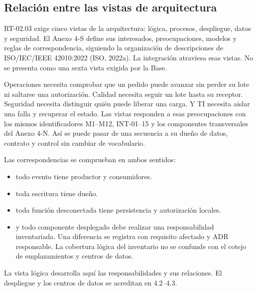 \subsection{Relación entre las vistas de arquitectura}
\label{sec:iso42010}

RT-02.03 exige cinco vistas de la arquitectura: lógica, procesos, despliegue, datos y seguridad. El Anexo 4-S define sus interesados, preocupaciones, modelos y reglas de correspondencia, siguiendo la organización de descripciones de ISO/IEC/IEEE 42010:2022 (ISO, 2022a). La integración atraviesa esas vistas. No se presenta como una sexta vista exigida por la Base.

Operaciones necesita comprobar que un pedido puede avanzar sin perder su lote ni saltarse una autorización. Calidad necesita seguir un lote hasta su receptor. Seguridad necesita distinguir quién puede liberar una carga. Y TI necesita aislar una falla y recuperar el estado. Las vistas responden a esas preocupaciones con los mismos identificadores M1--M12, INT-01--15 y los componentes transversales del Anexo 4-N. Así se puede pasar de una secuencia a su dueño de datos, contrato y control sin cambiar de vocabulario.

Las correspondencias se comprueban en ambos sentidos:

\begin{itemize}
  \item todo evento tiene productor y consumidores.
  \item toda escritura tiene dueño.
  \item toda función desconectada tiene persistencia y autorización locales.
  \item y todo componente desplegado debe realizar una responsabilidad inventariada. Una diferencia se registra con requisito afectado y ADR responsable. La cobertura lógica del inventario no se confunde con el cotejo de emplazamientos y centros de datos.
\end{itemize}

La vista lógica desarrolla aquí las responsabilidades y sus relaciones. El despliegue y los centros de datos se acreditan en 4.2--4.3.


